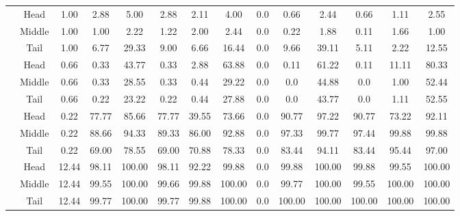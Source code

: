 \begin{table*}[h]
{\begin{tabular}{cccccccccccccc}
    & Head     & 1.00 & 2.88	&5.00&	2.88&	2.11&	4.00    & 0.0  & 0.66  & 2.44  & 0.66  & 1.11  & 2.55    \\
    & Middle & 1.00 & 1.00	&2.22&	1.22&	2.00&	2.44    & 0.0  & 0.22  & 1.88  & 0.11  & 1.66  & 1.00    \\
    & Tail & 1.00 & 6.77	&29.33&	9.00&	6.66&	16.44    & 0.0  & 9.66  & 39.11  & 5.11  & 2.22  & 12.55    \\
\midrule
{} 
    & Head     & 0.66 & 0.33	&43.77&	0.33&	2.88&	63.88    & 0.0  & 0.11  & 61.22  & 0.11  & 11.11  & 80.33    \\
    & Middle & 0.66 & 0.33	&28.55&	0.33&	0.44&	29.22    & 0.0  & 0.0  & 44.88  & 0.0  & 1.00  & 52.44    \\
    & Tail & 0.66 & 0.22	&23.22&	0.22&	0.44&	27.88    & 0.0  & 0.0  & 43.77  & 0.0  &  1.11 & 52.55    \\
\midrule
{} 
    & Head     & 0.22 & 77.77	&85.66&	77.77&	39.55& 73.66    & 0.0  & 90.77  & 97.22  & 90.77  & 73.22  & 92.11    \\
    & Middle & 0.22 & 88.66	&94.33&	89.33&	86.00& 92.88  & 0.0  & 97.33  & 99.77  & 97.44  & 99.88  & 99.88   \\
    & Tail & 0.22 & 69.00	&78.55&	69.00&	70.88&	78.33    & 0.0  & 83.44  & 94.11  & 83.44  & 95.44  & 97.00    \\
\midrule
{} 
    & Head     & 12.44 & 98.11	&100.00&	98.11&	92.22&	99.88    & 0.0  & 99.88  & 100.00  & 99.88  & 99.55  & 100.00    \\
    & Middle & 12.44 & 99.55	&100.00&	99.66&	99.88&	100.00    & 0.0  & 99.77  & 100.00  & 99.55  & 100.00  & 100.00    \\
    & Tail & 12.44 & 99.77	&100.00&	99.77&	99.88&	100.00    & 0.0  & 100.00  & 100.00  & 100.00  & 100.00  & 100.00    \\


\end{tabular}}
\end{table*}
